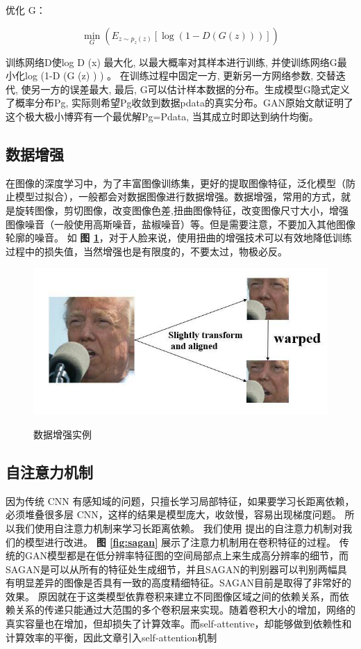 优化 G：

\begin{equation}
\min_G (E_{z \sim p_z(z)} [\log (1 - D(G(z)))])
\end{equation}


训练网络D使log D (x) 最大化, 以最大概率对其样本进行训练, 并使训练网络G最小化log (1-D (G (z) ) ) 。
在训练过程中固定一方, 更新另一方网络参数, 交替迭代, 使另一方的误差最大, 最后, G可以估计样本数据的分布。生成模型G隐式定义了概率分布Pg, 实际则希望Pg收敛到数据pdata的真实分布。GAN原始文献证明了这个极大极小博弈有一个最优解Pg=Pdata, 当其成立时即达到纳什均衡。

\subsection{数据增强}
在图像的深度学习中，为了丰富图像训练集，更好的提取图像特征，泛化模型（防止模型过拟合），一般都会对数据图像进行数据增强。数据增强，常用的方式，就是旋转图像，剪切图像，改变图像色差,扭曲图像特征，改变图像尺寸大小，增强图像噪音（一般使用高斯噪音，盐椒噪音）等。但是需要注意，不要加入其他图像轮廓的噪音。
如 \textbf{图 \ref{fig:data_aug}}，对于人脸来说，使用扭曲的增强技术可以有效地降低训练过程中的损失值，当然增强也是有限度的，不要太过，物极必反。

\begin{figure}[h!]
	\caption{数据增强实例}
	\centering
	\includegraphics[width=\textwidth]{data_aug.jpg}
	\label{fig:data_aug}
\end{figure}

\subsection{自注意力机制}
因为传统 CNN 有感知域的问题，只擅长学习局部特征，如果要学习长距离依赖，必须堆叠很多层 CNN，这样的结果是模型庞大，收敛慢，容易出现梯度问题。
所以我们使用自注意力机制来学习长距离依赖。
我们使用 提出的自注意力机制对我们的模型进行改进。
\textbf{图 \ref{fig:sagan}} 展示了注意力机制用在卷积特征的过程。
传统的GAN模型都是在低分辨率特征图的空间局部点上来生成高分辨率的细节，而SAGAN是可以从所有的特征处生成细节，并且SAGAN的判别器可以判别两幅具有明显差异的图像是否具有一致的高度精细特征。SAGAN目前是取得了非常好的效果。
原因就在于这类模型依靠卷积来建立不同图像区域之间的依赖关系，而依赖关系的传递只能通过大范围的多个卷积层来实现。随着卷积大小的增加，网络的真实容量也在增加，但却损失了计算效率。而self-attentive，却能够做到依赖性和计算效率的平衡，因此文章引入self-attention机制

